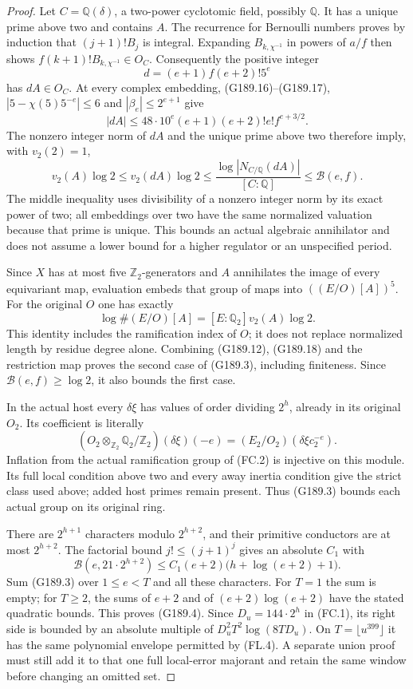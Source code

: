 \begin{proof}
Let $C=\mathbb Q(\delta)$, a two-power cyclotomic field, possibly
$\mathbb Q$.  It has a unique prime above two and contains $A$.
The recurrence for Bernoulli numbers proves by induction that
$(j+1)!B_j$ is integral.  Expanding $B_{k,\chi^{-1}}$ in powers
of $a/f$ then shows
$f(k+1)!B_{k,\chi^{-1}}\in O_C$.
Consequently the positive integer
\[
                    d=(e+1)f(e+2)!5^e
\]
has $dA\in O_C$.
At every complex embedding, (G189.16)--(G189.17),
$|5-\chi(5)5^{-e}|\leq6$ and $|\beta_e|\leq2^{e+1}$ give
\[
 |dA|\leq48\cdot10^e(e+1)(e+2)!e!f^{e+3/2}.
\]
The nonzero integer norm of $dA$ and the unique prime above two
therefore imply, with $v_2(2)=1$,
\[
 v_2(A)\log2\leq v_2(dA)\log2
       \leq\frac{\log|N_{C/\mathbb Q}(dA)|}{[C:\mathbb Q]}
       \leq\mathcal B(e,f).
 \tag{G189.18}
\]
The middle inequality uses divisibility of a nonzero integer
norm by its exact power of two; all embeddings over two have
the same normalized valuation because that prime is unique.
This bounds an actual algebraic annihilator and does not assume
a lower bound for a higher regulator or an unspecified period.

Since $X$ has at most five $\mathbb Z_2$-generators and $A$
annihilates the image of every equivariant map, evaluation embeds
that group of maps into $((E/O)[A])^5$.
For the original $O$ one has exactly
\[
 \log\#(E/O)[A]=[E:\mathbb Q_2]v_2(A)\log2.
\]
This identity includes the ramification index of $O$; it does
not replace normalized length by residue degree alone.
Combining (G189.12), (G189.18) and the restriction map proves
the second case of (G189.3), including finiteness.
Since $\mathcal B(e,f)\geq\log2$, it also bounds the first case.

In the actual host every $\delta\xi$ has values of order dividing
$2^h$, already in its original $O_2$.
Its coefficient is literally
\[
 (O_2\otimes_{\mathbb Z_2}\mathbb Q_2/\mathbb Z_2)
                         (\delta\xi)(-e)
       =(E_2/O_2)(\delta\xi c_2^{-e}).
 \tag{G189.19}
\]
Inflation from the actual ramification group of (FC.2) is
injective on this module.  Its full local condition above two
and every away inertia condition give the strict class used
above; added host primes remain present.
Thus (G189.3) bounds each actual group on its original ring.

There are $2^{h+1}$ characters modulo $2^{h+2}$, and their
primitive conductors are at most $2^{h+2}$.
The factorial bound $j!\leq(j+1)^j$ gives an absolute $C_1$ with
\[
 \mathcal B(e,21\cdot2^{h+2})
       \leq C_1(e+2)\bigl(h+\log(e+2)+1\bigr).
\]
Sum (G189.3) over $1\leq e<T$ and all these characters.
For $T=1$ the sum is empty; for $T\geq2$, the sums of $e+2$
and of $(e+2)\log(e+2)$ have the stated quadratic bounds.
This proves (G189.4).
Since $D_u=144\cdot2^h$ in (FC.1), its right side is bounded
by an absolute multiple of $D_u^2T^2\log(8TD_u)$.
On $T=\lfloor u^{399}\rfloor$ it has the same polynomial
envelope permitted by (FL.4).  A separate union proof must still
add it to that one full local-error majorant and retain the same
window before changing an omitted set.
\end{proof}


